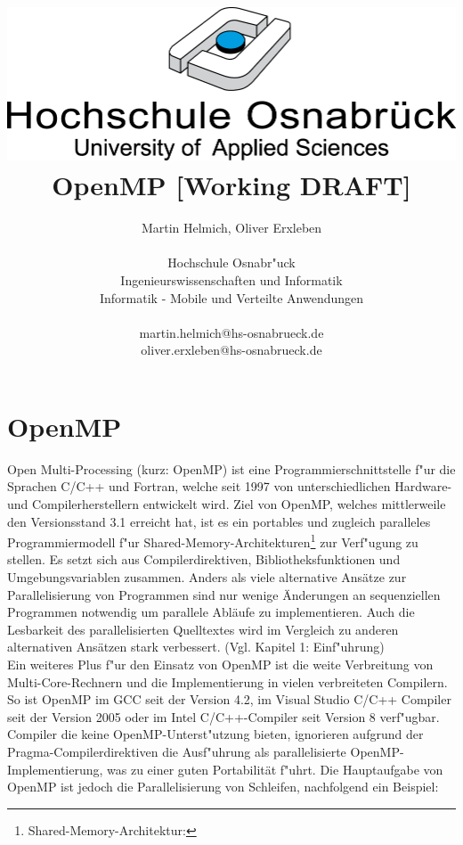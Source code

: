 \documentclass[11pt]{scrartcl}
\begin{document}
\author{ Martin Helmich, Oliver Erxleben \\ \\ Hochschule Osnabr"uck \\
Ingenieurswissenschaften und Informatik \\ Informatik - Mobile und Verteilte Anwendungen
\\ \\ martin.helmich@hs-osnabrueck.de \\ oliver.erxleben@hs-osnabrueck.de }

\title{\includegraphics[scale=0.75,keepaspectratio]{img/hs_os.png}\linebreak \linebreak
OpenMP [Working DRAFT]}

\maketitle
\thispagestyle{empty}
\tableofcontents

\pagebreak
\pagestyle{plain}
\setcounter{page}{1}
\section{OpenMP} Open Multi-Processing (kurz: OpenMP) ist eine Programmierschnittstelle
f"ur die Sprachen C/C++ und Fortran, welche seit 1997 von unterschiedlichen Hardware- und
Compilerherstellern entwickelt wird. Ziel von OpenMP, welches mittlerweile den
Versionsstand 3.1 erreicht hat, ist es ein portables und zugleich paralleles
Programmiermodell f"ur Shared-Memory-Architekturen\footnote{Shared-Memory-Architektur: }
zur Verf"ugung zu stellen. Es setzt sich aus Compilerdirektiven, Bibliotheksfunktionen und
Umgebungsvariablen zusammen. Anders als viele alternative Ansätze zur Parallelisierung von
Programmen sind nur wenige Änderungen an sequenziellen Programmen notwendig um parallele
Abläufe zu implementieren. Auch die Lesbarkeit des parallelisierten Quelltextes wird im
Vergleich zu anderen alternativen Ansätzen stark verbessert. (Vgl. \cite{omp08} Kapitel 1:
Einf"uhrung) \\ Ein weiteres Plus f"ur den Einsatz von OpenMP ist die weite Verbreitung
von Multi-Core-Rechnern und die Implementierung in vielen verbreiteten Compilern. So ist
OpenMP im GCC seit der Version 4.2, im Visual Studio C/C++ Compiler seit der Version 2005
oder im Intel C/C++-Compiler seit Version 8 verf"ugbar. Compiler die keine
OpenMP-Unterst"utzung bieten, ignorieren aufgrund der Pragma-Compilerdirektiven die
Ausf"uhrung als parallelisierte OpenMP-Implementierung, was zu einer guten Portabilität
f"uhrt. Die Hauptaufgabe von OpenMP ist jedoch die Parallelisierung von Schleifen,
nachfolgend ein Beispiel: \\
\end{document}

